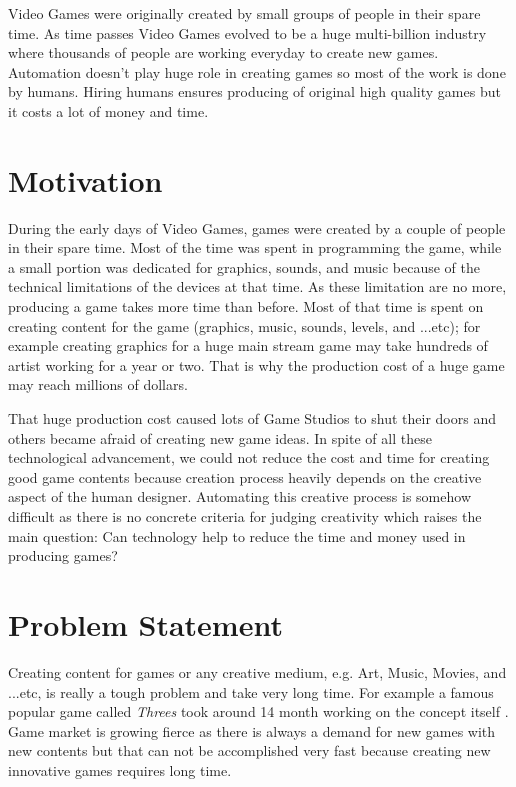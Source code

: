 Video Games were originally created by small groups of people in their spare time. As time passes Video Games evolved to be a huge multi-billion industry where thousands of people are working everyday to create new games. Automation doesn't play huge role in creating games so most of the work is done by humans. Hiring humans ensures producing of original high quality games but it costs a lot of money and time.

\section{Motivation}
During the early days of Video Games, games were created by a couple of people in their spare time. Most of the time was spent in programming the game, while a small portion was dedicated for graphics, sounds, and music because of the technical limitations of the devices at that time. As these limitation are no more, producing a game takes more time than before. Most of that time is spent on creating content for the game (graphics, music, sounds, levels, and ...etc)\cite{budgetAAA}; for example creating graphics for a huge main stream game may take hundreds of artist working for a year or two. That is why the production cost of a huge game may reach millions of dollars\cite{gameCost}.\\\par

That huge production cost caused lots of Game Studios to shut their doors \cite{gameCloses} and others became afraid of creating new game ideas. In spite of all these technological advancement, we could not reduce the cost and time for creating good game contents because creation process heavily depends on the creative aspect of the human designer. Automating this creative process is somehow difficult as there is no concrete criteria for judging creativity which raises the main question: Can technology help to reduce the time and money used in producing games?

\section{Problem Statement}
Creating content for games or any creative medium, e.g. Art, Music, Movies, and ...etc, is really a tough problem and take very long time. For example a famous popular game called \emph{Threes} took around 14 month working on the concept itself \cite{threesTime}. Game market is growing fierce as there is always a demand for new games with new contents but that can not be accomplished very fast because creating new innovative games requires long time.\\\par

